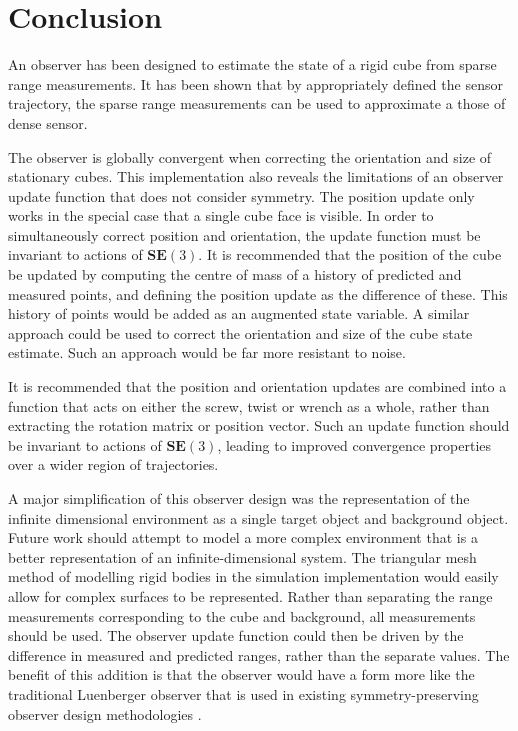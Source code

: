 \chapter*{Conclusion}

An observer has been designed to estimate the state of a rigid cube from sparse range measurements. It has been shown that by appropriately defined the sensor trajectory, the sparse range measurements can be used to approximate a those of dense sensor.

The observer is globally convergent when correcting the orientation and size of stationary cubes. This implementation also reveals the limitations of an observer update function that does not consider symmetry. The position update only works in the special case that a single cube face is visible. In order to simultaneously correct position and orientation, the update function must be invariant to actions of $\mathbf{SE}(3)$.
It is recommended that the position of the cube be updated by computing the centre of mass of a history of predicted and measured points, and defining the position update as the difference of these. This history of points would be added as an augmented state variable. A similar approach could be used to correct the orientation and size of the cube state estimate. Such an approach would be far more resistant to noise.

It is recommended that the position and orientation updates are combined into a function that acts on either the screw, twist or wrench as a whole, rather than extracting the rotation matrix or position vector. Such an update function should be invariant to actions of $\mathbf{SE}(3)$, leading to improved convergence properties over a wider region of trajectories.

A major simplification of this observer design was the representation of the infinite dimensional environment as a single target object and background object. Future work should attempt to model a more complex environment that is a better representation of an infinite-dimensional system. The triangular mesh method of modelling rigid bodies in the simulation implementation would easily allow for complex surfaces to be represented. Rather than separating the range measurements corresponding to the cube and background, all measurements should be used. The observer update function could then be driven by the difference in measured and predicted ranges, rather than the separate values. The benefit of this addition is that the observer would have a form more like the traditional Luenberger observer that is used in existing symmetry-preserving observer design methodologies \cite{bonnabel2009non,mahony2013observers}.


